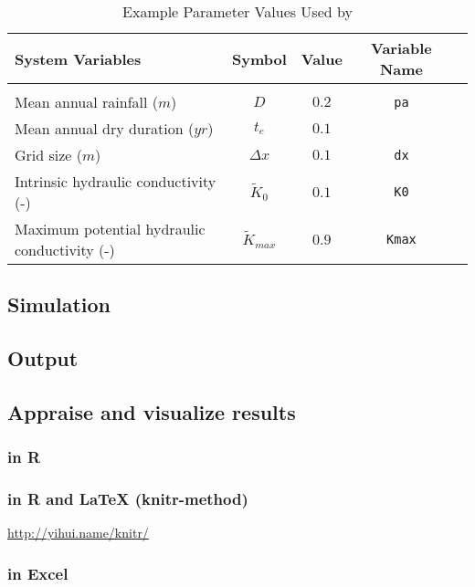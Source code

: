 \begin{table}
\begin{tabulary}{\textwidth}{Lcccc}
System Variables & Symbol & Value & Variable Name\\
\hline \\
Mean annual rainfall ($\unit{m}$) & $D$ & $0.2$ & \texttt{pa}\\
Mean annual dry duration ($\unit{yr}$) & $t_e$ & $0.1$ & \\
Grid size ($m$) & $\Delta x$ & $0.1$ & \texttt{dx}\\
Intrinsic hydraulic conductivity (-) & $\widetilde{K}_0$ & $0.1$ & \texttt{K0} \\
Maximum potential hydraulic conductivity (-) & $\widetilde{K}_{max}$ & $0.9$ & \texttt{Kmax} \\
\end{tabulary}
\caption{Example Parameter Values Used by \citet{gav2012}}
\end{table}

\subsection{Simulation}


\subsection{Output}


\subsection{Appraise and visualize results}


\subsubsection{in R }


\subsubsection{in R and \protect\LaTeX{} (knitr-method)}

\url{http://yihui.name/knitr/}

\subsubsection{in Excel}